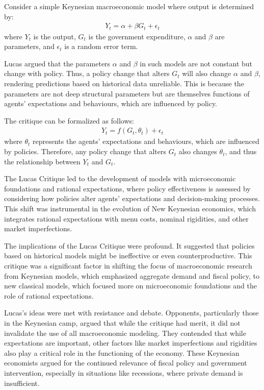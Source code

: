 \documentclass[12pt]{article}
\begin{document}
Consider a simple Keynesian macroeconomic model where output is determined by:
\begin{align*}
    Y_t = \alpha + \beta G_t + \epsilon_t 
\end{align*}
where \(Y_t\) is the output, \(G_t\) is the government expenditure, \(\alpha\) and \(\beta\) are parameters, and
\(\epsilon_t\) is a random error term. 

Lucas argued that the parameters \(\alpha\) and \(\beta\) in such models are not constant but change with policy. Thus,
a policy change that alters \(G_t\) will also change \(\alpha\) and \(\beta\), rendering predictions based on historical
data unreliable. This is because the parameters are not deep structural parameters but are themselves functions of
agents' expectations and behaviours, which are influenced by policy. 

The critique can be formalized as follows:
\begin{align*}
    Y_t = f(G_t, \theta_t) + \epsilon_t
\end{align*}
where \(\theta_t\) represents the agents' expectations and behaviours, which are influenced by policies. Therefore, any
policy change that alters \(G_t\) also changes \(\theta_t\), and thus the relationship between \(Y_t\) and \(G_t\). 

The Lucas Critique led to the development of models with microeconomic foundations and rational expectations, where
policy effectiveness is assessed by considering how policies alter agents' expectations and decision-making processes.
This shift was instrumental in the evolution of New Keynesian economics, which integrates rational expectations with
menu costs, nominal rigidities, and other market imperfections. 

The implications of the Lucas Critique were profound. It suggested that policies based on historical models might be
ineffective or even counterproductive. This critique was a significant factor in shifting the focus of macroeconomic
research from Keynesian models, which emphasized aggregate demand and fiscal policy, to new classical models, which
focused more on microeconomic foundations and the role of rational expectations. 

Lucas's ideas were met with resistance and debate. Opponents, particularly those in the Keynesian camp, argued that
while the critique had merit, it did not invalidate the use of all macroeconomic modeling. They contended that while
expectations are important, other factors like market imperfections and rigidities also play a critical role in the
functioning of the economy. These Keynesian economists argued for the continued relevance of fiscal policy and
government intervention, especially in situations like recessions, where private demand is insufficient. 
\end{document}
